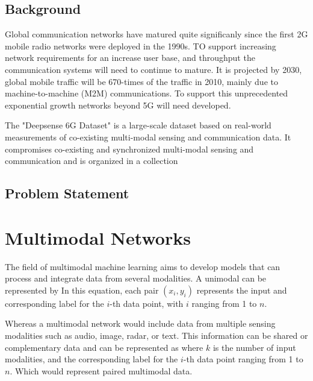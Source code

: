\documentclass{UCF_ETD}
\begin{document}
\subsection{Background}

Global communication networks have matured quite significanly since the first 2G mobile radio networks were deployed in the 1990s. TO support increasing network requirements for an increase user base, and throughput the communication systems will need to continue to mature. It is projected by 2030, global mobile traffic will be 670-times of the traffic in 2010, mainly due to machine-to-machine (M2M) communications. \cite{salameh20225g}\cite{ITU2370} To support this unprecedented exponential growth networks beyond 5G will need developed.


The "Deepsense 6G Dataset" is a large-scale dataset based on real-world measurements of co-existing multi-modal sensing and communication data. It compromises co-existing and synchronized multi-modal sensing and communication and is organized in a collection 
\cite{alkhateeb2023deepsense}


\subsection{Problem Statement}



\section{Multimodal Networks}
The field of multimodal machine learning aims to develop models that can process and integrate data from several modalities. A unimodal can be represented by \equationDu In this equation, each pair \( (x_i, y_i) \) represents the input and corresponding label for the \( i \)-th data point, with \( i \) ranging from 1 to \( n \). \cite{zong2023self}

Whereas a multimodal network would include data from multiple sensing modalities such as audio, image, radar, or text. This information can be shared or complementary data and can be represented as \equationDm where \( k \) is the number of input modalities,  and the corresponding label for the \( i \)-th data point ranging from 1 to \(n \). Which would represent paired multimodal data. \cite{zong2023self} 
\end{document}
